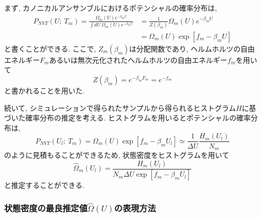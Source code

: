 まず, カノニカルアンサンブルにおけるポテンシャルの確率分布は, 
\begin{align}
    P_{NVT}(U;~T_{m})
    =
    \frac{\Omega_{m}(U) e^{-\beta_{m}U}}{\int dU~\Omega_{m}(U)e^{-\beta_{m}U}}
    &=
    \frac{1}{Z(\beta_{m})} \Omega_{m}(U) e^{-\beta_{m}U}
    \\
    &=
    \Omega_{m}(U) \exp[f_{m} - \beta_{m}U]
    \label{Eq:WHAM-ProbDist-NVT}
\end{align}
と書くことができる. ここで, $Z_{m}(\beta_{m})$は分配関数であり, ヘルムホルツの自由エネルギー$F_{m}$あるいは無次元化されたヘルムホルツの自由エネルギー$f_{m}$を用いて
\begin{equation}
    Z(\beta_{m}) = e^{-\beta_{m}F_{m}} = e^{-f_{m}}
\end{equation}
と書かれることを用いた. 

続いて, シミュレーションで得られたサンプルから得られるヒストグラム$H$に基づいた確率分布の推定を考える. 
ヒストグラムを用いるとポテンシャルの確率分布は, 
\begin{equation}
    P_{NVT}(U_{l};~T_{m}) =
    \Omega_{m}(U) \exp[f_{m} - \beta_{m}U_{l}]
    \simeq
    \frac{1}{\Delta U} \frac{H_{m}(U_{l})}{N_{m}}
\end{equation}
のように見積もることができるため, 状態密度をヒストグラムを用いて
\begin{equation}
    \hat{\Omega}_{m}(U_{l}) =
    \frac{H_{m}(U_{l})}{N_{m}\Delta U \exp[f_{m}-\beta_{m}U_{l}]}
    \label{Eq:Density-of-States-Mth}
\end{equation}
と推定することができる. 


\subsubsection{状態密度の最良推定値$\hat{\Omega}(U)$の表現方法}

